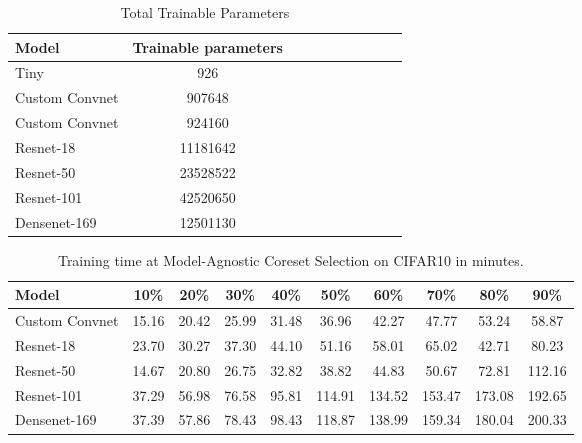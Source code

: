 \documentclass{article}
\begin{document}



\begin{table}[h!]
    \centering
    \caption{Total Trainable Parameters}
    \label{tab:trainable_parameters}
    \begin{tabular}{lccccccccc}
        \toprule
        \textbf{Model} & \textbf{Trainable parameters} \\
        \midrule
        Tiny & 926 \\
        Custom Convnet & 907648 \\
        Custom Convnet & 924160 \\
        Resnet-18 & 11181642\\
        Resnet-50 & 23528522\\
        Resnet-101& 42520650 \\
        Densenet-169 & 12501130 \\

        \bottomrule
    \end{tabular}
\end{table}

\begin{table}[t]
    \centering
    \caption{Training time at Model-Agnostic Coreset Selection on CIFAR10 in minutes.}
    \label{tab:training_time}
    \begin{tabular}{lccccccccc}
        \toprule
        \textbf{Model} & \textbf{10\%} & \textbf{20\%} & \textbf{30\%} & \textbf{40\%} & \textbf{50\%} & \textbf{60\%} & \textbf{70\%} & \textbf{80\%} & \textbf{90\%} \\
        \midrule
        Custom Convnet &  15.16 & 20.42 & 25.99 & 31.48 & 36.96 & 42.27 &47.77 & 53.24 & 58.87 \\
        Resnet-18 &  23.70 & 30.27& 37.30 & 44.10& 51.16& 58.01& 65.02& 42.71& 80.23 \\
        Resnet-50 &  14.67& 20.80&  26.75& 32.82& 38.82 & 44.83& 50.67 & 72.81& 112.16 \\
        Resnet-101 & 37.29  &56.98  & 76.58 & 95.81& 114.91& 134.52& 153.47 & 173.08& 192.65 \\
        Densenet-169 & 37.39 & 57.86& 78.43& 98.43& 118.87& 138.99& 159.34& 180.04& 200.33\\

        \bottomrule
    \end{tabular}
\end{table}
\end{document}
